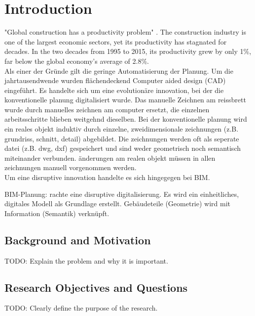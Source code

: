 \chapter{Introduction}
\label{sec:introduction}

"Global construction has a productivity problem" \cite{barbosaReinventingConstructionRoute2017}. The construction industry is one of the largest economic sectors, yet its productivity has stagnated for decades. In the two decades from 1995 to 2015, its productivity grew by only 1\%, far below the global economy's average of 2.8\%. \\
Als einer der Gründe gilt die geringe Automatisierung der Planung. Um die jahrtausendwende wurden flächendeckend Computer aided design (CAD) eingeführt. Es handelte sich um eine evolutionäre innovation, bei der die konventionelle planung digitalisiert wurde. Das manuelle Zeichnen am reissbrett wurde durch manuelles zeichnen am computer ersetzt, die einzelnen arbeitsschritte blieben weitgehnd dieselben. Bei der konventionelle planung wird ein reales objekt induktiv durch einzelne, zweidimensionale zeichnungen (z.B. grundriss, schnitt, detail) abgebildet. Die zeichnungen werden oft als seperate datei (z.B. dwg, dxf) gespeichert und sind weder geometrisch noch semantisch miteinander verbunden. änderungen am realen objekt müssen in allen zeichnungen manuell vorgenommen werden. \\
Um eine disruptive innovation handelte es sich hingegegen bei BIM.  

BIM-Planung: rachte eine disruptive digitalisierung. Es wird ein einheitliches, digitales Modell als Grundlage erstellt. Gebäudeteile (Geometrie) wird mit Information (Semantik) verknüpft.



\section{Background and Motivation}
TODO: Explain the problem and why it is important. \cite{borrusoProceduralPointCloud2023}

\section{Research Objectives and Questions}
TODO: Clearly define the purpose of the research. \cite{mayBIMImImmobilienbetrieb2022}

